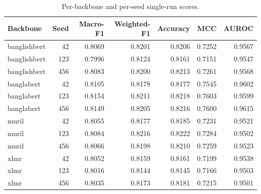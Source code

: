 \begin{table}
\caption{Per-backbone and per-seed single-run scores.}
\label{tab:per_run}
\begin{tabular}{lrrrrrr}
\toprule
Backbone & Seed & Macro-F1 & Weighted-F1 & Accuracy & MCC & AUROC \\
\midrule
banglishbert & 42 & 0.8069 & 0.8201 & 0.8206 & 0.7252 & 0.9567 \\
banglishbert & 123 & 0.7996 & 0.8124 & 0.8161 & 0.7151 & 0.9547 \\
banglishbert & 456 & 0.8083 & 0.8200 & 0.8213 & 0.7261 & 0.9568 \\
banglabert & 42 & 0.8105 & 0.8178 & 0.8177 & 0.7545 & 0.9602 \\
banglabert & 123 & 0.8154 & 0.8211 & 0.8218 & 0.7603 & 0.9599 \\
banglabert & 456 & 0.8149 & 0.8205 & 0.8216 & 0.7600 & 0.9615 \\
muril & 42 & 0.8055 & 0.8177 & 0.8185 & 0.7231 & 0.9521 \\
muril & 123 & 0.8084 & 0.8216 & 0.8222 & 0.7284 & 0.9502 \\
muril & 456 & 0.8066 & 0.8198 & 0.8210 & 0.7259 & 0.9523 \\
xlmr & 42 & 0.8052 & 0.8159 & 0.8161 & 0.7199 & 0.9538 \\
xlmr & 123 & 0.8016 & 0.8144 & 0.8145 & 0.7166 & 0.9503 \\
xlmr & 456 & 0.8035 & 0.8173 & 0.8181 & 0.7215 & 0.9501 \\
\bottomrule
\end{tabular}
\end{table}

